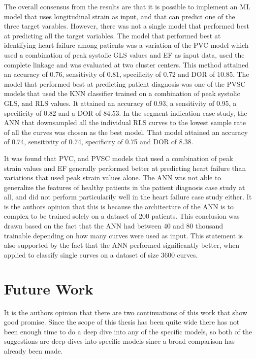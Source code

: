 The overall consensus from the results are that it is possible to implement an ML model that uses longitudinal strain as input, and that can predict one of the three target varables. However, there was not a single model that performed best at predicting all the target variables. The model that performed best at identifying heart failure among patients was a variation of the PVC model which used a combination of peak systolic GLS values and EF as input data, used the complete linkage and was evaluated at two cluster centers. This method attained an accuracy of 0.76, sensitivity of 0.81, specificity of 0.72 and DOR of 10.85. The model that performed best at predicting patient diagnosis was one of the PVSC models that used the KNN classifier trained on a combination of peak systolic GLS, and RLS values. It attained an accuracy of 0.93, a sensitivity of 0.95, a specificity of 0.82 and a DOR of 84.53.
In the segment indication case study, the ANN that downsampled all the individual RLS curves to the lowest sample rate of all the curves was chosen as the best model. That model attained an accuracy of 0.74, sensitivity of 0.74, specificity of 0.75 and DOR of 8.38. \bigskip

It was found that PVC, and PVSC models that used a combination of peak strain values and EF generally performed better at predicting heart failure than variations that used peak strain values alone. The ANN was not able to generalize the features of healthy patients in the patient diagnosis case study at all, and did not perform particularily well in the heart failure case study either. It is the authors opinion that this is because the architecture of the ANN is to complex to be trained solely on a dataset of 200 patients. This conclusion was drawn based on the fact that the ANN had between 40 and 80 thousand trainable depending on how many curves were used as input. This statement is also supported by the fact that the ANN performed significantly better, when applied to classify single curves on a dataset of size 3600 curves.

\section{Future Work}

It is the authors opinion that there are two continuations of this work that show good promise. Since the scope of this thesis has been quite wide there has not been enough time to do a deep dive into any of the specific models, so both of the suggestions are deep dives into specific models since a broad comparison has already been made.

